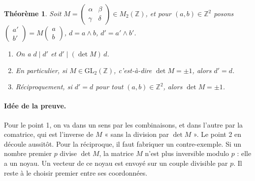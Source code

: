 \documentclass[11pt,a4paper]{article}
\theoremstyle{plain}
\newtheorem{theoreme}{Théorème}[section]
\theoremstyle{definition}
\theoremstyle{remark}
\newcommand{\Z}{\mathbb{Z}}
\newcommand{\GL}{\mathrm{GL}}
\newcommand{\pgcd}{\wedge}
\begin{document}
\begin{theoreme}\label{thm:gl2}
Soit $M=\begin{pmatrix}\alpha&\beta\\\gamma&\delta\end{pmatrix}\in M_2(\Z)$, et pour $(a,b)\in\Z^2$ posons $\begin{pmatrix}a'\\b'\end{pmatrix}=M\begin{pmatrix}a\\b\end{pmatrix}$, $d=a\pgcd b$, $d'=a'\pgcd b'$.
\begin{enumerate}[nosep]
\item On a $d\mid d'$ et $d'\mid (\det M)\,d$.
\item En particulier, si $M\in\GL_2(\Z)$, c'est-à-dire $\det M=\pm1$, alors $d'=d$.
\item Réciproquement, si $d'=d$ pour tout $(a,b)\in\Z^2$, alors $\det M=\pm1$.
\end{enumerate}
\end{theoreme}

\paragraph{Idée de la preuve.} Pour le point 1, on va dans un sens par les combinaisons, et dans l'autre par la comatrice, qui est l'inverse de $M$ « sans la division par $\det M$ ». Le point 2 en découle aussitôt. Pour la réciproque, il faut fabriquer un contre-exemple. Si un nombre premier $p$ divise $\det M$, la matrice $M$ n'est plus inversible modulo $p$ : elle a un noyau. Un vecteur de ce noyau est envoyé sur un couple divisible par $p$. Il reste à le choisir premier entre ses coordonnées.
\end{document}
